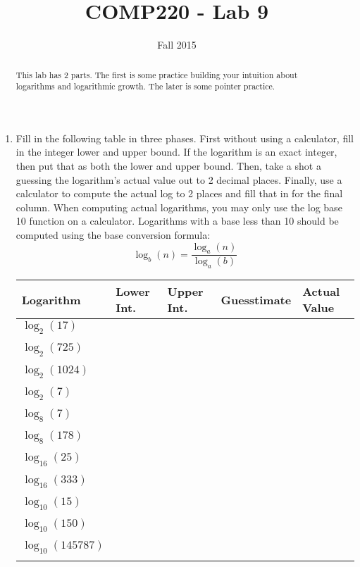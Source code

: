 \documentclass[10pt]{article}
\title{COMP220 - Lab 9}
\author{ }
\date{Fall 2015}
\begin{document}
\maketitle
\thispagestyle{empty}

\begin{abstract}
This lab has 2 parts. The first is some practice building your intuition about logarithms and logarithmic growth. The later is some pointer practice.
\end{abstract}

\begin{enumerate}
\item Fill in the following table in three phases. First without using a calculator, fill in the integer lower and upper bound. If the logarithm is an exact integer, then put that as both the lower and upper bound. Then, take a shot a guessing the logarithm's actual value out to 2 decimal places. Finally, use a calculator to compute the actual log to 2 places and fill that in for the final column. When computing actual logarithms, you may only use the log base 10 function on a calculator. Logarithms with a base less than 10 should be computed using the base conversion formula:
\[
\log_b(n) = \dfrac{\log_a(n)}{\log_a(b)}
\]

\begin{center}
\begin{tabular}{|l|l|l|l|l|}
\hline
Logarithm & Lower Int. & Upper Int. & Guesstimate & Actual Value\\ \hline
$\log_2(17)$ &  &  &  & \\ 
 & & & & \\ \hline
$\log_2(725)$  &  &  &  & \\ 
 & & & & \\ \hline
$\log_2(1024)$ &  &  &  & \\ 
 & & & & \\ \hline
$\log_2(7)$ &  &  &  & \\ 
 & & & & \\ \hline
 $\log_8(7)$ &  &  &  & \\ 
 & & & & \\ \hline
$\log_8(178)$ &  &  &  & \\ 
 & & & & \\ \hline
$\log_{16}(25)$ &  &  &  & \\ 
 & & & & \\ \hline
$\log_{16}(333)$ &  &  &  & \\ 
 & & & & \\ \hline
$\log_{10}(15)$ &  &  &  & \\ 
 & & & & \\ \hline
$\log_{10}(150)$ &  &  &  & \\ 
 & & & & \\ \hline
$\log_{10}(145787)$ &  &  &  & \\ 
 & & & & \\ \hline
\end{tabular}
\end{center}
\newpage \thispagestyle{empty}


\end{enumerate}
\end{document}
